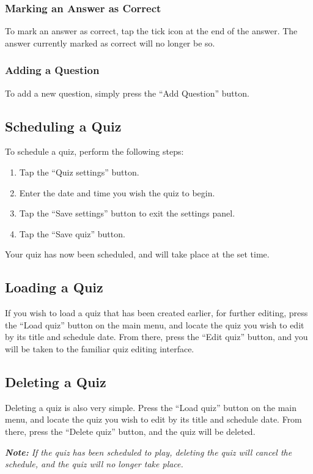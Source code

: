 \subsubsection{Marking an Answer as Correct} %
\label{ssub:marking_an_answer_as_correct}
To mark an answer as correct, tap the tick icon at the end of the answer. The answer currently marked as correct will no longer be so.

\subsubsection{Adding a Question} %
\label{ssub:adding_a_question}
To add a new question, simply press the ``Add Question'' button.


\subsection{Scheduling a Quiz} %
\label{sub:scheduling_a_quiz}
To schedule a quiz, perform the following steps:

\begin{enumerate}
\item Tap the ``Quiz settings'' button.
\item Enter the date and time you wish the quiz to begin.
\item Tap the ``Save settings'' button to exit the settings panel.
\item Tap the ``Save quiz'' button.
\end{enumerate}

Your quiz has now been scheduled, and will take place at the set time.

\subsection{Loading a Quiz} %
\label{sub:loading_a_quiz}
If you wish to load a quiz that has been created earlier, for further editing, press the ``Load quiz'' button on the main menu, and locate the quiz you wish to edit by its title and schedule date. From there, press the ``Edit quiz'' button, and you will be taken to the familiar quiz editing interface.

\subsection{Deleting a Quiz} %
\label{sub:deleting_a_quiz}
Deleting a quiz is also very simple. Press the ``Load quiz'' button on the main menu, and locate the quiz you wish to edit by its title and schedule date. From there, press the ``Delete quiz'' button, and the quiz will be deleted.

\textit{\textbf{Note:} If the quiz has been scheduled to play, deleting the quiz will cancel the schedule, and the quiz will no longer take place.}
